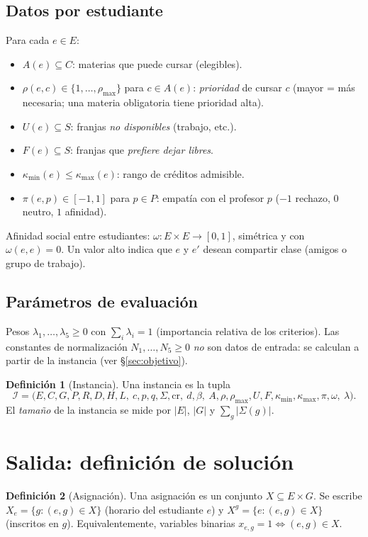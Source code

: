\documentclass[11pt,letterpaper]{article}
\theoremstyle{definition}
\newtheorem{definicion}{Definición}
\theoremstyle{remark}
\theoremstyle{plain}
\newcommand{\card}[1]{\lvert #1 \rvert}
\begin{document}
\subsection{Datos por estudiante}
Para cada $e\in E$:
\begin{itemize}[nosep]
  \item $A(e)\subseteq C$: materias que puede cursar (elegibles).
  \item $\rho(e,c)\in\{1,\dots,\rho_{\max}\}$ para $c\in A(e)$: \emph{prioridad}
        de cursar $c$ (mayor = más necesaria; una materia obligatoria tiene
        prioridad alta).
  \item $U(e)\subseteq S$: franjas \emph{no disponibles} (trabajo, etc.).
  \item $F(e)\subseteq S$: franjas que \emph{prefiere dejar libres}.
  \item $\kappa_{\min}(e)\le\kappa_{\max}(e)$: rango de créditos admisible.
  \item $\pi(e,p)\in[-1,1]$ para $p\in P$: empatía con el profesor $p$
        ($-1$ rechazo, $0$ neutro, $1$ afinidad).
\end{itemize}
Afinidad social entre estudiantes: $\omega:E\times E\to[0,1]$, simétrica y
con $\omega(e,e)=0$. Un valor alto indica que $e$ y $e'$ desean compartir
clase (amigos o grupo de trabajo).

\subsection{Parámetros de evaluación}
Pesos $\lambda_1,\dots,\lambda_5\ge 0$ con $\sum_i\lambda_i=1$ (importancia
relativa de los criterios). Las constantes de normalización
$N_1,\dots,N_5\ge 0$ \emph{no} son datos de entrada: se calculan a partir de
la instancia (ver §\ref{sec:objetivo}).

\begin{definicion}[Instancia]
Una instancia es la tupla
\[
\mathcal{I}=\bigl(E,C,G,P,R,D,H,L,\ c,p,q,\Sigma,\mathrm{cr},\ d,\beta,\
A,\rho,\rho_{\max},U,F,\kappa_{\min},\kappa_{\max},\pi,\omega,\ \lambda\bigr).
\]
El \emph{tamaño} de la instancia se mide por $\card{E}$, $\card{G}$ y
$\sum_{g}\card{\Sigma(g)}$.
\end{definicion}

\section{Salida: definición de solución}
\begin{definicion}[Asignación]
Una asignación es un conjunto $X\subseteq E\times G$. Se escribe
$X_e=\{g : (e,g)\in X\}$ (horario del estudiante $e$) y
$X^g=\{e : (e,g)\in X\}$ (inscritos en $g$). Equivalentemente, variables
binarias $x_{e,g}=1 \iff (e,g)\in X$.
\end{definicion}
\end{document}
